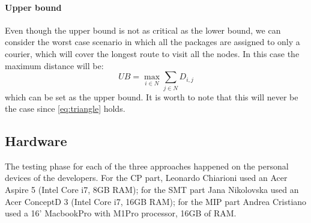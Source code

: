\paragraph{Upper bound} Even though the upper bound is not as critical as the lower bound, we can consider the worst case scenario in which all the packages are assigned to only a courier, which will cover the longest route to visit all the nodes. In this case the maximum distance will be:
\begin{equation}
    UB = \max_{i \in N} \sum_{j \in N} D_{i,j}
\end{equation}
which can be set as the upper bound. It is worth to note that this will never be the case since \eqref{eq:triangle} holds.

\subsection{Hardware}
The testing phase for each of the three approaches happened on the personal devices of the developers. For the CP part, Leonardo Chiarioni used an Acer Aspire 5 (Intel Core i7, 8GB RAM); for the SMT part Jana Nikolovska used an  Acer ConceptD 3 (Intel Core i7, 16GB RAM); for the MIP part Andrea Cristiano used a 16' MacbookPro with M1Pro processor, 16GB of RAM. 